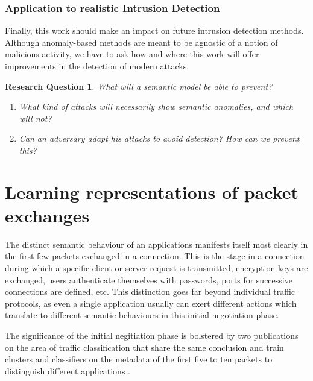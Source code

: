 \documentclass[a4paper,12pt,twoside]{report}
\newtheorem{rquestion}{Research Question}
\begin{document}
\subsubsection{Application to realistic Intrusion Detection}

Finally, this work should make an impact on future intrusion detection methods. Although anomaly-based methods are meant to be agnostic of a notion of malicious activity, we have to ask how and where this work will offer improvements in the detection of modern attacks.

\begin{rquestion}
What will a semantic model be able to prevent? 
\begin{enumerate}
\item What kind of attacks will necessarily show semantic anomalies, and which will not?
\item Can an adversary adapt his attacks to avoid detection? How can we prevent this?
\end{enumerate}
\end{rquestion}


\section{Learning representations of packet exchanges}\label{Repr}

The distinct semantic behaviour of an applications manifests itself most clearly in the first few packets exchanged in a connection. This is the stage in a connection during which a specific client or server request is transmitted, encryption keys are exchanged, users authenticate themselves with passwords, ports for successive connections are defined, etc. This distinction goes far beyond individual traffic protocols, as even a single application usually can exert different actions which translate to different semantic behaviours in this initial negotiation phase. 

The significance of the initial negitiation phase is bolstered by two publications on the area of traffic classification that share the same conclusion and train clusters and classifiers on the metadata of the first five to ten packets to distinguish different applications \cite{bernaille2006traffic,crotti2007traffic}.
\end{document}
